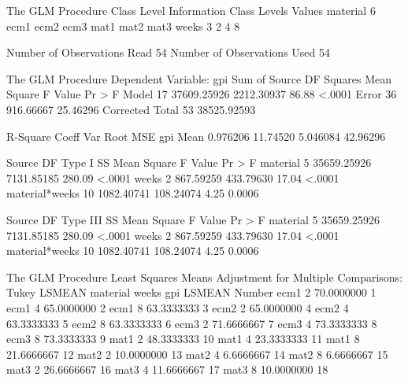 \documentclass{article}
\begin{document}
\begin{Woutput}
The GLM Procedure
               Class Level Information
Class         Levels    Values
material           6    ecm1 ecm2 ecm3 mat1 mat2 mat3
weeks              3    2 4 8

Number of Observations Read          54
Number of Observations Used          54

The GLM Procedure
Dependent Variable: gpi
                                        Sum of
Source                      DF         Squares     Mean Square    F Value    Pr > F
Model                       17     37609.25926      2212.30937      86.88    <.0001
Error                       36       916.66667        25.46296
Corrected Total             53     38525.92593

R-Square     Coeff Var      Root MSE      gpi Mean
0.976206      11.74520      5.046084      42.96296

Source                      DF       Type I SS     Mean Square    F Value    Pr > F
material                     5     35659.25926      7131.85185     280.09    <.0001
weeks                        2       867.59259       433.79630      17.04    <.0001
material*weeks              10      1082.40741       108.24074       4.25    0.0006

Source                      DF     Type III SS     Mean Square    F Value    Pr > F
material                     5     35659.25926      7131.85185     280.09    <.0001
weeks                        2       867.59259       433.79630      17.04    <.0001
material*weeks              10      1082.40741       108.24074       4.25    0.0006

The GLM Procedure
Least Squares Means
Adjustment for Multiple Comparisons: Tukey
                                       LSMEAN
material    weeks      gpi LSMEAN      Number
ecm1        2          70.0000000           1
ecm1        4          65.0000000           2
ecm1        8          63.3333333           3
ecm2        2          65.0000000           4
ecm2        4          63.3333333           5
ecm2        8          63.3333333           6
ecm3        2          71.6666667           7
ecm3        4          73.3333333           8
ecm3        8          73.3333333           9
mat1        2          48.3333333          10
mat1        4          23.3333333          11
mat1        8          21.6666667          12
mat2        2          10.0000000          13
mat2        4           6.6666667          14
mat2        8           6.6666667          15
mat3        2          26.6666667          16
mat3        4          11.6666667          17
mat3        8          10.0000000          18


\end{Woutput}
\end{document}

